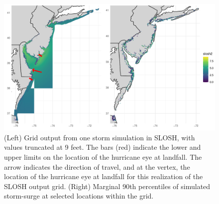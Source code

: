 \begin{figure}[t!]
    \centering
    \includegraphics[width = 0.8\linewidth]{./plots/slosh_combined}
    \caption{(Left) Grid output from one storm simulation in SLOSH, with values 
    truncated at 9 feet.  The bars (red) indicate the lower and upper limits on the 
    location of the hurricane eye at landfall.  The arrow indicates the direction 
    of travel, and at the vertex, the location of the hurricane eye at landfall 
    for this realization of the SLOSH output grid.  (Right) Marginal 90th 
    percentiles of simulated storm-surge at selected locations within the grid. 
    \label{fig:sloshexplore}}
\end{figure}

